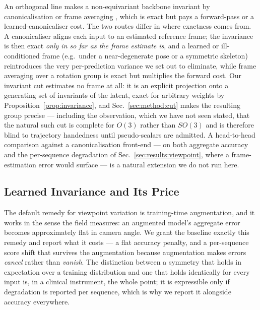 \documentclass[10pt,journal]{IEEEtran}
\begin{document}
An orthogonal line makes a non-equivariant backbone invariant by canonicalisation or frame averaging \cite{puny2022frameaveraging}, which is exact but pays a forward-pass or a learned-canonicaliser cost. The two routes differ in where exactness comes from. A canonicaliser aligns each input to an estimated reference frame; the invariance is then exact \emph{only in so far as the frame estimate is}, and a learned or ill-conditioned frame (e.g.\ under a near-degenerate pose or a symmetric skeleton) reintroduces the very per-prediction variance we set out to eliminate, while frame averaging over a rotation group is exact but multiplies the forward cost. Our invariant cut estimates no frame at all: it is an explicit projection onto a generating set of invariants of the latent, exact for arbitrary weights by Proposition~\ref{prop:invariance}, and Sec.~\ref{sec:method:cut} makes the resulting group precise --- including the observation, which we have not seen stated, that the natural such cut is complete for $O(3)$ rather than $SO(3)$ and is therefore blind to trajectory handedness until pseudo-scalars are admitted. A head-to-head comparison against a canonicalisation front-end --- on both aggregate accuracy and the per-sequence degradation of Sec.~\ref{sec:results:viewpoint}, where a frame-estimation error would surface --- is a natural extension we do not run here.

\subsection{Learned Invariance and Its Price}
The default remedy for viewpoint variation is training-time augmentation, and it works in the sense the field measures: an augmented model's aggregate error becomes approximately flat in camera angle. We grant the baseline exactly this remedy and report what it costs --- a flat accuracy penalty, and a per-sequence score shift that survives the augmentation because augmentation makes errors \emph{cancel} rather than \emph{vanish}. The distinction between a symmetry that holds in expectation over a training distribution and one that holds identically for every input is, in a clinical instrument, the whole point; it is expressible only if degradation is reported per sequence, which is why we report it alongside accuracy everywhere.
\end{document}
